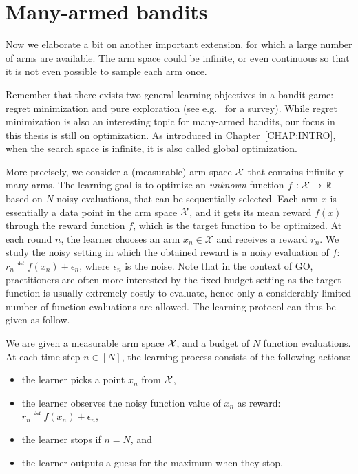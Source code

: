 \section{Many-armed bandits}\label{sec:mab.continuum}

Now we elaborate a bit on another important extension, for which a large number of arms are available. The arm space could be infinite, or even continuous so that it is not even possible to sample each arm once.

Remember that there exists two general learning objectives in a bandit game: regret minimization and pure exploration (see e.g.~\citealt{kaufmann2017survey} for a survey). While regret minimization is also an interesting topic for many-armed bandits, our focus in this thesis is still on optimization. As introduced in Chapter~\ref{CHAP:INTRO}, when the search space is infinite, it is also called global optimization.

More precisely, we consider a (measurable) arm space $\mathcal{X}$ that contains infinitely-many arms. The learning goal is to optimize an \emph{unknown} function $f: \mathcal{X} \rightarrow \mathbb{R}$ based on $N$ noisy evaluations, that can be sequentially selected. Each arm $x$ is essentially a data point in the arm space $\mathcal{X}$, and it gets its mean reward $f(x)$ through the reward function $f$, which is the target function to be optimized. At each round $n$, the learner chooses an arm $x_n \in \mathcal{X}$ and receives a reward $r_n$. We study the noisy setting in which the obtained reward is a noisy evaluation of $f$: $r_n \eqdef f(x_n) + \epsilon_n$, where $\epsilon_n$ is the noise. Note that in the context of GO, practitioners are often more interested by the fixed-budget setting as the target function is usually extremely costly to evaluate, hence only a considerably limited number of function evaluations are allowed. The learning protocol can thus be given as follow.

\begin{definition}\label{def:mab.go}
\begin{leftbar}[defnbar]
	We are given a measurable arm space $\mathcal{X}$, and a budget of $N$ function evaluations. At each time step $n\in[N]$, the learning process consists of the following actions:
\begin{itemize}
	\item the learner picks a point $x_n$ from $\mathcal{X}$,
	\item the learner observes the noisy function value of $x_n$ as reward: $r_n \eqdef f(x_n) + \epsilon_n$,
	\item the learner stops if $n=N$, and
	\item the learner outputs a guess for the maximum when they stop.
\end{itemize}
\end{leftbar}
\end{definition}

